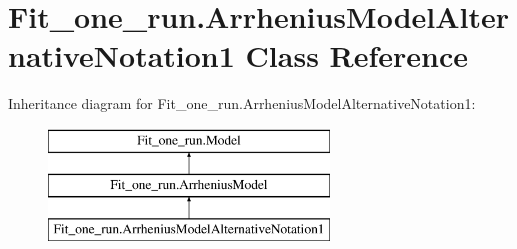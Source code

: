 \hypertarget{classFit__one__run_1_1ArrheniusModelAlternativeNotation1}{\section{\-Fit\-\_\-one\-\_\-run.\-Arrhenius\-Model\-Alternative\-Notation1 \-Class \-Reference}
\label{classFit__one__run_1_1ArrheniusModelAlternativeNotation1}
}
\-Inheritance diagram for \-Fit\-\_\-one\-\_\-run.\-Arrhenius\-Model\-Alternative\-Notation1\-:\begin{figure}[H]
\begin{center}
\leavevmode
\includegraphics[height=3.000000cm]{classFit__one__run_1_1ArrheniusModelAlternativeNotation1}
\end{center}
\end{figure}
